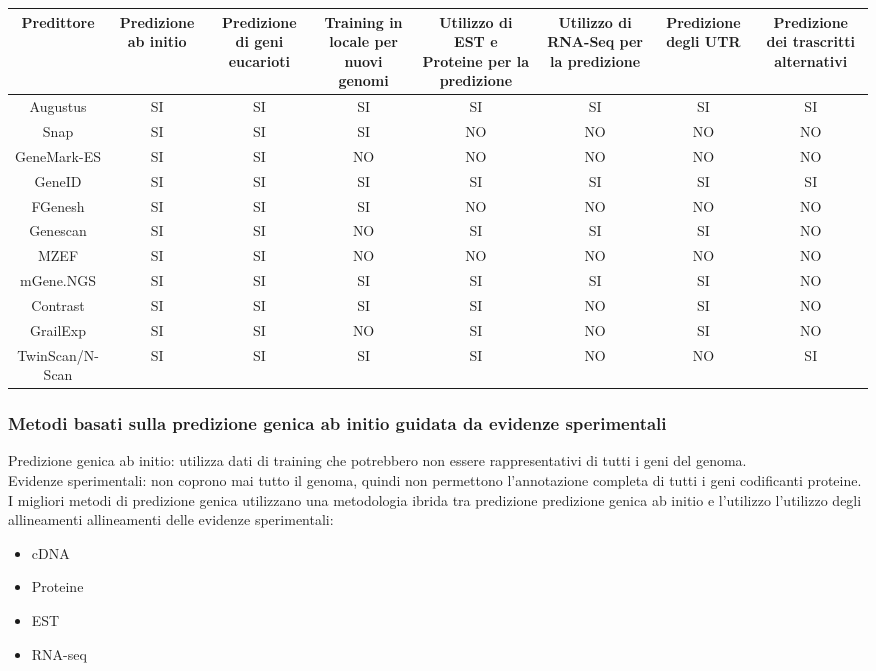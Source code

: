 \documentclass{article}
\begin{document}
\begin{center}
    \begin{tabular}{*{8}c}
        \toprule
        \multicolumn{1}{p{1.5cm}}{\centering Predittore}
        & \multicolumn{1}{p{1.5cm}}{\centering Predizione ab initio}
        & \multicolumn{1}{p{1.5cm}}{\centering Predizione di geni eucarioti} & 
        \multicolumn{1}{p{1.5cm}}{\centering Training in locale per nuovi genomi} & 
        \multicolumn{1}{p{1.5cm}}{\centering Utilizzo di EST e Proteine per la predizione} &
        \multicolumn{1}{p{1.5cm}}{\centering Utilizzo di RNA-Seq per la predizione} 
        & \multicolumn{1}{p{1.5cm}}{\centering Predizione degli UTR}
        & \multicolumn{1}{p{1.5cm}}{\centering Predizione dei trascritti alternativi} \\
        \midrule
        Augustus & SI & SI & SI & SI & SI & SI & SI \\
        Snap & SI & SI & SI & NO & NO & NO & NO\\
        GeneMark-ES & SI & SI & NO & NO & NO & NO & NO\\
        GeneID & SI & SI & SI & SI & SI & SI & SI \\
        FGenesh & SI & SI & SI & NO & NO & NO & NO \\
        Genescan & SI & SI & NO & SI & SI & SI & NO \\
        MZEF & SI & SI & NO & NO & NO & NO & NO \\
        mGene.NGS & SI & SI & SI & SI & SI & SI & NO \\
        Contrast & SI & SI & SI & SI & NO & SI & NO \\
        GrailExp & SI & SI & NO & SI & NO & SI & NO \\
        TwinScan/N-Scan & SI & SI & SI & SI & NO & NO & SI
    \end{tabular}
\end{center}

\subsubsection{Metodi basati sulla predizione genica ab initio guidata da evidenze sperimentali}
Predizione genica ab initio: utilizza dati di training che potrebbero non
essere rappresentativi di tutti i geni del genoma.\\
Evidenze sperimentali: non coprono mai tutto il genoma, quindi non
permettono l'annotazione completa di tutti i geni codificanti proteine.\\
I migliori metodi di predizione genica utilizzano una metodologia
ibrida tra predizione predizione genica ab initio e l'utilizzo l'utilizzo degli allineamenti allineamenti delle
evidenze sperimentali:
\begin{itemize}
    \item cDNA
    \item Proteine
    \item EST
    \item RNA-seq
\end{itemize}
\end{document}
